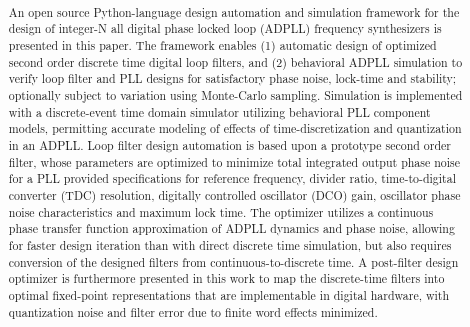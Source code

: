 

\pagestyle{fancy}
\fancyhf{}
\rhead{\fontfamily{\sfdefault}\selectfont \textbf{\rightmark}}

\title{\textbf{}}
\date{}

\sloppy\RaggedRight
	
	
	\pagebreak
	\thispagestyle{blank}
	\null\pagebreak

	\justify
	\setcounter{page}{1}
	\pagebreak
	\thispagestyle{nohdr}
	\begin{abstract} \large\fontfamily{\rmdefault}\selectfont \
		
		\vspace{-2em}An open source Python-language design automation and simulation framework for the design of integer-N all digital phase locked loop (ADPLL) frequency synthesizers is presented in this paper. The framework enables (1) automatic design of optimized second order discrete time digital loop filters, and (2) behavioral ADPLL simulation to verify loop filter and PLL designs for satisfactory phase noise, lock-time and stability; optionally subject to variation using Monte-Carlo sampling. Simulation is implemented with a discrete-event time domain simulator utilizing behavioral PLL component models, permitting accurate modeling of effects of time-discretization and quantization in an ADPLL. Loop filter design automation is based upon a prototype second order filter, whose parameters are optimized to minimize total integrated output phase noise for a PLL provided specifications for reference frequency, divider ratio, time-to-digital converter (TDC) resolution, digitally controlled oscillator (DCO) gain, oscillator phase noise characteristics and maximum lock time. The optimizer utilizes a continuous phase transfer function approximation of ADPLL dynamics and phase noise, allowing for faster design iteration than with direct discrete time simulation, but also requires conversion of the designed filters from continuous-to-discrete time. A post-filter design optimizer is furthermore presented in this work to map the discrete-time filters into optimal fixed-point representations that are implementable in digital hardware, with quantization noise and filter error due to finite word effects minimized. 
	\end{abstract}

